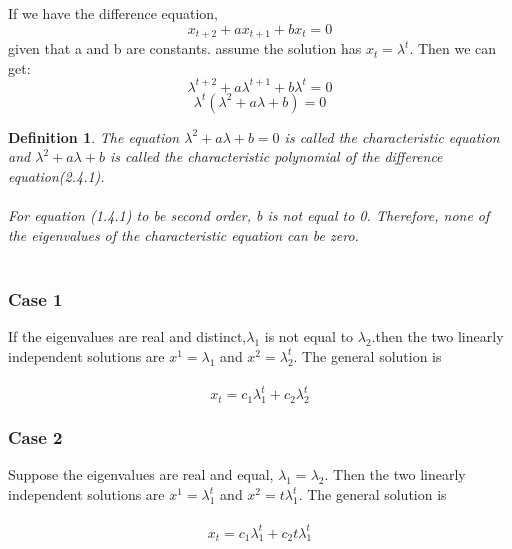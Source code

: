\documentclass[12pt]{article}
\newtheorem{definition}{Definition}[section]
\begin{document}
If we have the difference equation,
\begin{equation}
    x_{t+2}+ax_{t+1}+bx_{t}=0\tag{1.4.1}
\end{equation}
given that a and b are constants. assume the solution has $x_{t}=\lambda^{t}$. Then we can get:
\begin{equation*}
    \lambda^{t+2}+a\lambda^{t+1}+b\lambda^{t}=0\tag{1.4.2}
\end{equation*}
\begin{equation*}
    \lambda^{t}(\lambda^{2}+a\lambda+b)=0\tag{1.4.3}
\end{equation*}

\begin{definition}
The equation $\lambda^2+a\lambda+b=0$ is called the characteristic equation and $\lambda^{2}+a\lambda+b$ is called the characteristic polynomial of the difference equation(2.4.1).\\\\
For equation (1.4.1) to be second order, b is not equal to 0. Therefore, none of the eigenvalues of the characteristic equation can be zero.\\\\
\end{definition}

\subsubsection{Case 1}
If the eigenvalues are real and distinct,$\lambda_1$ is not equal to $\lambda_2$.then the two linearly independent solutions are $x^{1}=\lambda_1$ and $x^2=\lambda^{t}_2$. The general solution is \\\\
\begin{equation}
    x_t=c_1\lambda^{t}_1+c_2\lambda^{t}_2\tag{1.4.1.1}
\end{equation}

\subsubsection{Case 2}
Suppose the eigenvalues are real and equal, $\lambda_1=\lambda_2$. Then the two linearly independent solutions are $x^1=\lambda^t_{1}$ and $x^2=t\lambda^t_{1}$. The general solution is\\\\
\begin{equation}
    x_t=c_1\lambda^t_{1}+c_2t\lambda^t_{1}\tag{1.4.1.2}
\end{equation}
\end{document}
